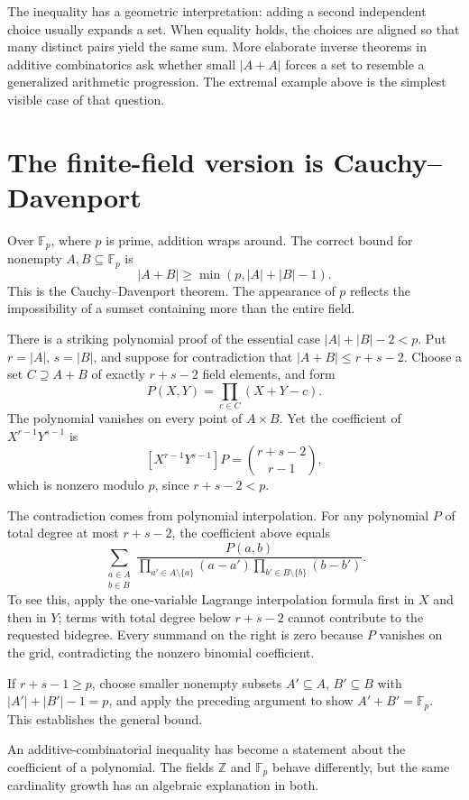 The inequality has a geometric interpretation: adding a second independent choice usually expands a set. When equality holds, the choices are aligned so that many distinct pairs yield the same sum. More elaborate inverse theorems in additive combinatorics ask whether small \(|A+A|\) forces a set to resemble a generalized arithmetic progression. The extremal example above is the simplest visible case of that question.

\section{The finite-field version is Cauchy--Davenport}

Over \(\mathbb F_p\), where \(p\) is prime, addition wraps around. The correct bound for nonempty \(A,B\subseteq\mathbb F_p\) is
\[
 \boxed{|A+B|\ge\min(p,|A|+|B|-1).}
\]
This is the Cauchy--Davenport theorem. The appearance of \(p\) reflects the impossibility of a sumset containing more than the entire field.

There is a striking polynomial proof of the essential case \(|A|+|B|-2<p\). Put \(r=|A|\), \(s=|B|\), and suppose for contradiction that \(|A+B|\le r+s-2\). Choose a set \(C\supseteq A+B\) of exactly \(r+s-2\) field elements, and form
\[
 P(X,Y)=\prod_{c\in C}(X+Y-c).
\]
The polynomial vanishes on every point of \(A\times B\). Yet the coefficient of \(X^{r-1}Y^{s-1}\) is
\[
 [X^{r-1}Y^{s-1}]P=\binom{r+s-2}{r-1},
\]
which is nonzero modulo \(p\), since \(r+s-2<p\).

The contradiction comes from polynomial interpolation. For any polynomial \(P\) of total degree at most \(r+s-2\), the coefficient above equals
\[
 \sum_{\substack{a\in A\\b\in B}}
 \frac{P(a,b)}
 {\displaystyle
  \prod_{a'\in A\setminus\{a\}}(a-a')
  \prod_{b'\in B\setminus\{b\}}(b-b')}.
\]
To see this, apply the one-variable Lagrange interpolation formula first in \(X\) and then in \(Y\); terms with total degree below \(r+s-2\) cannot contribute to the requested bidegree. Every summand on the right is zero because \(P\) vanishes on the grid, contradicting the nonzero binomial coefficient.

If \(r+s-1\ge p\), choose smaller nonempty subsets \(A'\subseteq A\), \(B'\subseteq B\) with \(|A'|+|B'|-1=p\), and apply the preceding argument to show \(A'+B'=\mathbb F_p\). This establishes the general bound.

An additive-combinatorial inequality has become a statement about the coefficient of a polynomial. The fields \(\mathbb Z\) and \(\mathbb F_p\) behave differently, but the same cardinality growth has an algebraic explanation in both.

